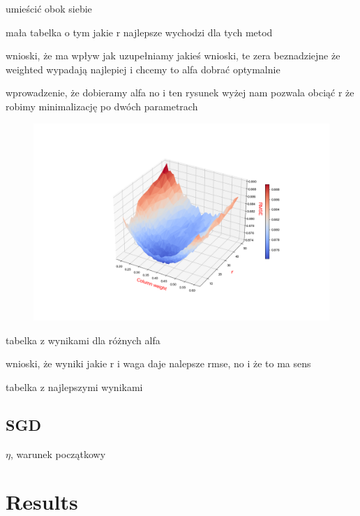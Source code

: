 \documentclass[11pt]{amsart}
\newcommand{\tami}[1]{{\textcolor{magenta}{#1}}}
\begin{document}
umieścić obok siebie

mała tabelka o tym jakie r najlepsze wychodzi dla tych metod

wnioski, że ma wpływ jak uzupełniamy
jakieś wnioski, te zera beznadziejne
że weighted wypadają najlepiej i chcemy to alfa dobrać optymalnie


wprowadzenie, że dobieramy alfa
no i ten rysunek wyżej nam pozwala obciąć r
że robimy minimalizację po dwóch parametrach

\begin{figure}[H]
\includegraphics[scale=0.45]{fig/svd1_r_w}
\label{fig:figure}
\end{figure}

tabelka z wynikami dla różnych alfa

wnioski, że
wyniki jakie r i waga daje nalepsze rmse, no i że to ma sens

tabelka z najlepszymi wynikami

%




\subsection*{SGD} $\eta$, warunek początkowy

\section{Results}
\end{document}
